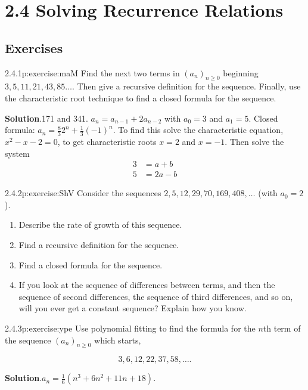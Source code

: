 \documentclass[twoside,11pt,]{book}
\newcommand{\blocktitlefont}{\relax}
\numberwithin{equation}{chapter}
\newcommand{\amp}{&}
\begin{document}
\section*{2.4 Solving Recurrence Relations}
\subsection*{Exercises}
\begin{divisionsolution}{2.4.1}{}{p:exercise:maM}%
Find the next two terms in \((a_n)_{n\ge 0}\) beginning \(3, 5, 11, 21, 43, 85\ldots\). Then give a recursive definition for the sequence. Finally, use the characteristic root technique to find a closed formula for the sequence.%
\par\smallskip%
\noindent\textbf{\blocktitlefont Solution}.\quad{}171 and 341. \(a_n = a_{n-1} + 2a_{n-2}\) with \(a_0 = 3\) and \(a_1 = 5\). Closed formula: \(a_n = \frac{8}{3}2^n + \frac{1}{3}(-1)^n\). To find this solve the characteristic equation, \(x^2 - x - 2 = 0\), to get characteristic roots \(x = 2\) and \(x=-1\). Then solve the system%
\begin{align*}
3 \amp = a + b\\
5 \amp = 2a - b
\end{align*}
%
\end{divisionsolution}%
\begin{divisionsolution}{2.4.2}{}{p:exercise:ShV}%
Consider the sequences \(2, 5, 12, 29, 70, 169, 408,\ldots\) (with \(a_0 = 2\)).%
\begin{enumerate}[label=(\alph*)]
\item{}Describe the rate of growth of this sequence.%
\item{}Find a recursive definition for the sequence.%
\item{}Find a closed formula for the sequence.%
\item{}If you look at the sequence of differences between terms, and then the sequence of second differences, the sequence of third differences, and so on, will you ever get a constant sequence? Explain how you know.%
\end{enumerate}
%
\end{divisionsolution}%
\begin{divisionsolution}{2.4.3}{}{p:exercise:ype}%
Use polynomial fitting to find the formula for the \(n\)th term of the sequence \((a_n)_{n \ge 0}\) which starts,%
\par
%
\begin{equation*}
3, 6, 12, 22, 37, 58, \ldots 
\text{.}
\end{equation*}
%
\par\smallskip%
\noindent\textbf{\blocktitlefont Solution}.\quad{}\(a_n = \frac{1}{6} (n^3 + 6n^2 + 11n + 18)\text{.}\)%
\end{divisionsolution}%
\end{document}
